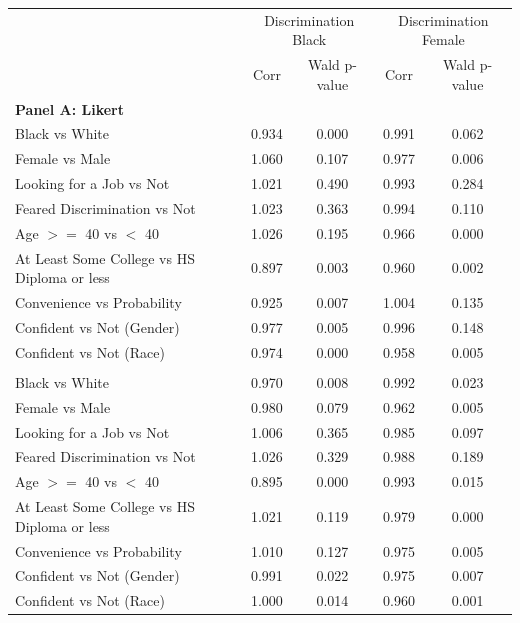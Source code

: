   \centering
  \begin{tabular}{lcccc}
    \toprule
    & \multicolumn{2}{c}{Discrimination Black} & \multicolumn{2}{c}{Discrimination Female} \\
    & Corr & Wald p-value & Corr & Wald p-value \\
    \midrule
    \multicolumn{5}{l}{\textbf{Panel A: Likert}}\\
    Black vs White & 0.934 & 0.000 & 0.991 & 0.062 \\
    Female vs Male & 1.060 & 0.107 & 0.977 & 0.006 \\
    Looking for a Job vs Not & 1.021 & 0.490 & 0.993 & 0.284 \\
    Feared Discrimination vs Not & 1.023 & 0.363 & 0.994 & 0.110 \\
    Age $>=$ 40 vs $<$ 40 & 1.026 & 0.195 & 0.966 & 0.000 \\
    At Least Some College vs HS Diploma or less & 0.897 & 0.003 & 0.960 & 0.002 \\
    Convenience vs Probability & 0.925 & 0.007 & 1.004 & 0.135 \\
    Confident vs Not (Gender) & 0.977 & 0.005 & 0.996 & 0.148 \\
    Confident vs Not (Race) & 0.974 & 0.000 & 0.958 & 0.005 \\
    \addlinespace
    \multicolumn{5}{l}{\textbf{Panel B: Borda}}\\
    Black vs White & 0.970 & 0.008 & 0.992 & 0.023 \\
    Female vs Male & 0.980 & 0.079 & 0.962 & 0.005 \\
    Looking for a Job vs Not & 1.006 & 0.365 & 0.985 & 0.097 \\
    Feared Discrimination vs Not & 1.026 & 0.329 & 0.988 & 0.189 \\
    Age $>=$ 40 vs $<$ 40 & 0.895 & 0.000 & 0.993 & 0.015 \\
    At Least Some College vs HS Diploma or less & 1.021 & 0.119 & 0.979 & 0.000 \\
    Convenience vs Probability & 1.010 & 0.127 & 0.975 & 0.005 \\
    Confident vs Not (Gender) & 0.991 & 0.022 & 0.975 & 0.007 \\
    Confident vs Not (Race) & 1.000 & 0.014 & 0.960 & 0.001 \\
    \bottomrule
  \end{tabular}
